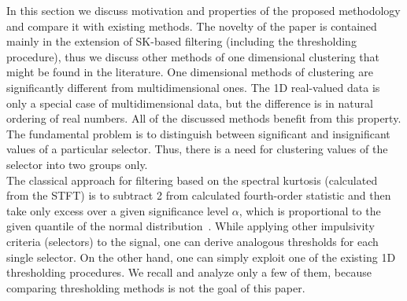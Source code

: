 In this section we discuss motivation and properties of the proposed methodology and compare it with existing methods. The novelty of the paper is contained mainly in the extension of SK-based filtering (including the thresholding procedure), thus we discuss other methods of one dimensional clustering that might be found in the literature. One dimensional methods of clustering are significantly different from multidimensional ones. The 1D real-valued data is only a special case of multidimensional data, but the difference is in natural ordering of real numbers. All of the discussed methods benefit from this property. The fundamental problem is to distinguish between significant and insignificant values of a particular selector. Thus, there is a need for clustering values of the selector into two groups only.\\
The classical approach for filtering based on the spectral kurtosis (calculated from the STFT) is to subtract 2 from calculated fourth-order statistic and then take only excess over a given significance level $\alpha$, which is proportional to the given quantile of the normal distribution~\cite{Combet2009652,Antoni2006308}. While applying other impulsivity criteria (selectors) to the signal, one can derive analogous thresholds for each single selector. On the other hand, one can simply exploit one of the existing 1D thresholding procedures. We recall and analyze only a few of them, because comparing thresholding methods is not the goal of this paper.\\
